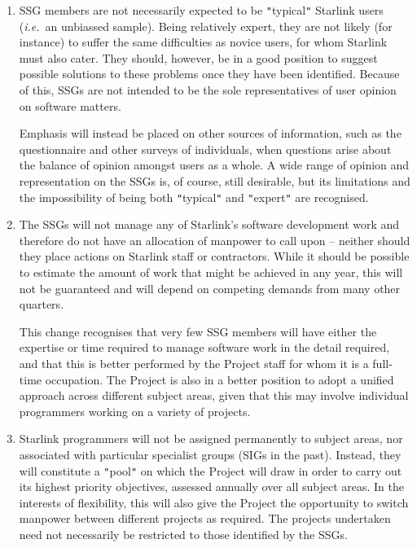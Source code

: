 \documentclass[11pt]{article}
\newcommand{\htmladdnormallink}[2]{#1}
\newcommand{\apref}[1]{\htmladdnormallink{#1}{http://star-www.rl.ac.uk/programmers.html}}
\newcommand{\staffref}[1]{\htmladdnormallink{#1}{http://star-www.rl.ac.uk/pro.html}}
\newcommand{\st}[1]{{\em{#1}}}
\newcommand{\qt}[1]{``#1''}
\renewcommand{\qt}[1]{{\tt{"}}#1{\tt{"}}}
\begin{document}
\begin{enumerate}

\item SSG members are not necessarily expected to be 
\qt{typical} Starlink users (\st{i.e.}\ an unbiassed sample).  Being
relatively expert, they are not likely (for instance) to suffer the
same difficulties as novice users, for whom Starlink must also cater.
They should, however, be in a good position to suggest possible
solutions to these problems once they have been identified.  Because
of this, SSGs are not intended to be the sole representatives of user
opinion on software matters.

Emphasis will instead be placed on other sources of information, such
as the questionnaire and other surveys of individuals, when
questions arise about the balance of opinion amongst users as a
whole. A wide range of opinion and representation on the SSGs is, of
course, still desirable, but its limitations and the impossibility of
being both \qt{typical} and \qt{expert} are recognised.

\item The SSGs will not manage any of Starlink's software development
work and therefore do not have an allocation of manpower to call upon
-- neither should they place actions on \staffref{Starlink staff} or
\apref{contractors}.  While it should be possible to estimate the
amount of work that might be achieved in any year, this will not be
guaranteed and will depend on competing demands from many other
quarters.

This change recognises that very few SSG members will 
have either the expertise or time required to manage software
work in the detail required, and that this is better performed by the
Project staff for whom it is a full-time occupation. The Project
is also in a better position to adopt a unified approach across
different subject areas, given that this may involve individual
programmers working on a variety of projects.

\item Starlink programmers will not be assigned permanently to subject
areas, nor associated with particular specialist groups (SIGs in the
past). Instead, they will constitute a \qt{pool} on which the Project
will draw in order to carry out its highest priority objectives,
assessed annually over all subject areas.  In the interests of
flexibility, this will also give the Project the opportunity to switch
manpower between different projects as required. The projects
undertaken need not necessarily be restricted to those identified by
the SSGs.


\end{enumerate}
\end{document}
